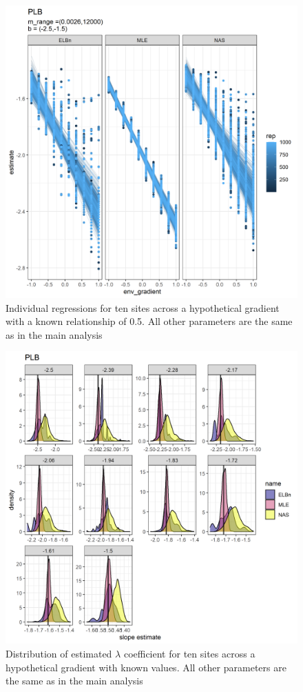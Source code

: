 \documentclass[
]{article}
\begin{document}
\begin{figure}
\centering
\includegraphics{figures/PLB_10_sites_main.png}
\caption{Individual regressions for ten sites across a hypothetical
gradient with a known relationship of 0.5. All other parameters are the
same as in the main analysis}
\end{figure}

\begin{figure}
\centering
\includegraphics{figures/PLB_10_sites_est_b_density.png}
\caption{Distribution of estimated \(\lambda\) coefficient for ten sites
across a hypothetical gradient with known values. All other parameters
are the same as in the main analysis}
\end{figure}
\end{document}
